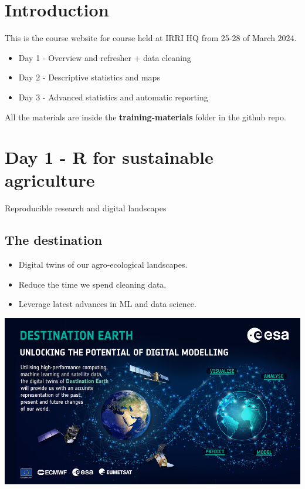 \documentclass[
  letterpaper,
  DIV=11,
  numbers=noendperiod]{scrreprt}
\providecommand{\tightlist}{%
  \setlength{\itemsep}{0pt}\setlength{\parskip}{0pt}}\usepackage{longtable,booktabs,array}
\begin{document}
\hypertarget{introduction-2}{%
\chapter{\texorpdfstring{\textbf{Introduction}}{Introduction}}\label{introduction-2}}

This is the course website for course held at IRRI HQ from 25-28 of
March 2024.

\begin{itemize}
\item
  Day 1 - Overview and refresher + data cleaning
\item
  Day 2 - Descriptive statistics and maps
\item
  Day 3 - Advanced statistics and automatic reporting
\end{itemize}

All the materials are inside the \textbf{training-materials} folder in
the github repo.

\hypertarget{day-1---r-for-sustainable-agriculture}{%
\chapter{Day 1 - R for sustainable
agriculture}\label{day-1---r-for-sustainable-agriculture}}

Reproducible research and digital landscapes

\hfill\break

\hypertarget{the-destination}{%
\section{The destination}\label{the-destination}}

\begin{itemize}
\tightlist
\item
  Digital twins of our agro-ecological landscapes.
\item
  Reduce the time we spend cleaning data.
\item
  Leverage latest advances in ML and data science.
\end{itemize}

\includegraphics{training-materials/presentation/digital_twins.jpeg}
\end{document}
